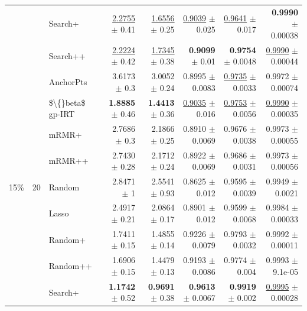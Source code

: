 \begin{longtable}{llp{}rrrrr}
 &  & Search+ & \underline{2.2755} {\scriptsize $\pm$ 0.41} & \underline{1.6556} {\scriptsize $\pm$ 0.25} & \underline{0.9039} {\scriptsize $\pm$ 0.025} & \underline{0.9641} {\scriptsize $\pm$ 0.017} & \textbf{0.9990} {\scriptsize $\pm$ 0.00038} \\
 &  & Search++ & \underline{2.2224} {\scriptsize $\pm$ 0.42} & \underline{1.7345} {\scriptsize $\pm$ 0.38} & \textbf{0.9099} {\scriptsize $\pm$ 0.01} & \textbf{0.9754} {\scriptsize $\pm$ 0.0048} & \underline{0.9990} {\scriptsize $\pm$ 0.00044} \\
 &  & AnchorPts & 3.6173 {\scriptsize $\pm$ 0.3} & 3.0052 {\scriptsize $\pm$ 0.24} & 0.8995 {\scriptsize $\pm$ 0.0083} & \underline{0.9735} {\scriptsize $\pm$ 0.0033} & 0.9972 {\scriptsize $\pm$ 0.00074} \\
 &  & \$\textbackslash\{\}beta\$ gp-IRT & \textbf{1.8885} {\scriptsize $\pm$ 0.46} & \textbf{1.4413} {\scriptsize $\pm$ 0.36} & \underline{0.9035} {\scriptsize $\pm$ 0.016} & \underline{0.9753} {\scriptsize $\pm$ 0.0056} & \underline{0.9990} {\scriptsize $\pm$ 0.00035} \\
 &  & mRMR+ & 2.7686 {\scriptsize $\pm$ 0.3} & 2.1866 {\scriptsize $\pm$ 0.25} & 0.8910 {\scriptsize $\pm$ 0.0069} & 0.9676 {\scriptsize $\pm$ 0.0038} & 0.9973 {\scriptsize $\pm$ 0.00055} \\
 &  & mRMR++ & 2.7430 {\scriptsize $\pm$ 0.28} & 2.1712 {\scriptsize $\pm$ 0.24} & 0.8922 {\scriptsize $\pm$ 0.0069} & 0.9686 {\scriptsize $\pm$ 0.0031} & 0.9973 {\scriptsize $\pm$ 0.00056} \\
\midrule
15\% & 20 & Random & 2.8471 {\scriptsize $\pm$ 1} & 2.5541 {\scriptsize $\pm$ 0.93} & 0.8625 {\scriptsize $\pm$ 0.012} & 0.9595 {\scriptsize $\pm$ 0.0039} & 0.9949 {\scriptsize $\pm$ 0.0021} \\
 &  & Lasso & 2.4917 {\scriptsize $\pm$ 0.21} & 2.0864 {\scriptsize $\pm$ 0.17} & 0.8901 {\scriptsize $\pm$ 0.012} & 0.9599 {\scriptsize $\pm$ 0.0068} & 0.9984 {\scriptsize $\pm$ 0.00033} \\
 &  & Random+ & 1.7411 {\scriptsize $\pm$ 0.15} & 1.4855 {\scriptsize $\pm$ 0.14} & 0.9226 {\scriptsize $\pm$ 0.0079} & 0.9793 {\scriptsize $\pm$ 0.0032} & 0.9992 {\scriptsize $\pm$ 0.00011} \\
 &  & Random++ & 1.6906 {\scriptsize $\pm$ 0.15} & 1.4479 {\scriptsize $\pm$ 0.13} & 0.9193 {\scriptsize $\pm$ 0.0086} & 0.9774 {\scriptsize $\pm$ 0.004} & 0.9993 {\scriptsize $\pm$ 9.1e-05} \\
 &  & Search+ & \textbf{1.1742} {\scriptsize $\pm$ 0.52} & \textbf{0.9691} {\scriptsize $\pm$ 0.38} & \textbf{0.9613} {\scriptsize $\pm$ 0.0067} & \textbf{0.9919} {\scriptsize $\pm$ 0.002} & \underline{0.9995} {\scriptsize $\pm$ 0.00028} \\

\end{longtable}
